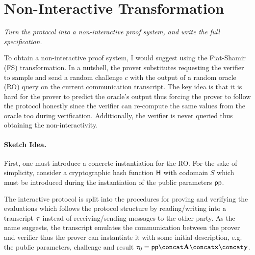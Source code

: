 
\section{Non-Interactive Transformation}

\begin{center}
	\itshape
	Turn the protocol into a non-interactive proof system, and write the full specification.
\end{center}


To obtain a non-interactive proof system, I would suggest using the Fiat-Shamir (FS) transformation.
In a nutshell, the prover substitutes requesting the verifier to sample and send a random challenge $c$
with the output of a random oracle (RO) query on the current communication transcript.
The key idea is that it is hard for the prover to predict the oracle's output thus
forcing the prover to follow the protocol honestly since the verifier can re-compute the
same values from the oracle too during verification.
Additionally, the verifier is never queried thus obtaining the non-interactivity.

\vspace{3mm}

\paragraph{Sketch Idea.}

First, one must introduce a concrete instantiation for the RO.
For the sake of simplicity, consider a cryptographic hash function $\hashf{}$ with codomain $S$
which must be introduced during the instantiation of the public parameters $\pp$.

The interactive protocol is split into the procedures for proving and verifying the evaluations
which follows the protocol structure by reading/writing into a transcript $\transcript$ instead
of receiving/sending messages to the other party.
%
As the name suggests, the transcript emulates the communication between the prover and verifier
thus the prover can instantiate it with some initial description, e.g. the public parameters,
challenge and result $\transcript[0] = \pp \concat \vA \concat \vx \concat \vy$.


